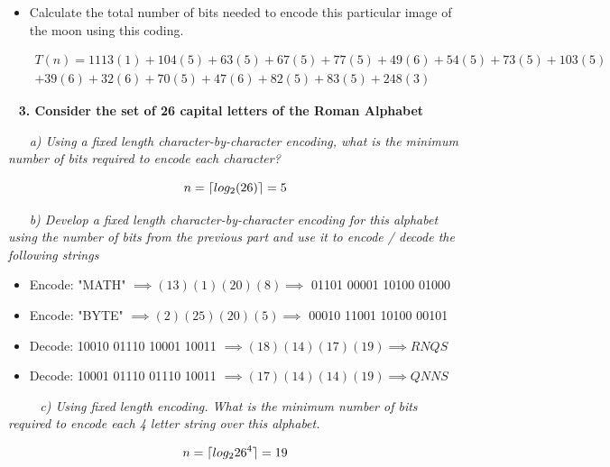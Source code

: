 \documentclass[12pt, letterpaper]{article}
\DeclarePairedDelimiter{\ceil}{\lceil}{\rceil}
\begin{document}
\begin{itemize}
\-\ \newline
\item Calculate the total number of bits needed to encode this particular image of the moon using this coding.

\begin{eqnarray*}
T(n) = 1113(1) + 104(5) + 63(5) + 67(5) + 77(5) + 49(6) + 54(5) + 73(5) + 103(5) \\
+ 39(6) + 32(6) + 70(5) + 47(6) + 82(5) + 83(5) + 248(3)
\end{eqnarray*}

\end{itemize}


\newpage
\-\ \newline
\bf{3. Consider the set of 26 capital letters of the Roman Alphabet}

\-\ \newline
\-\ \it{ a) Using a fixed length character-by-character encoding, what is the minimum number of bits required to encode each character? }

    \[ n = \ceil{ log_2(26) } = 5 \]

\-\ \newline
\-\ \it{ b) Develop a fixed length character-by-character encoding for this alphabet using the number of bits from the previous part and use it to encode / decode the following strings }
\begin{itemize}
\item Encode: "MATH" 
\(\implies (13)(1)(20)(8) \implies\) 01101 00001 10100 01000

\item Encode: "BYTE" 
\( \implies (2)(25)(20)(5) \implies \) 00010 11001 10100 00101

\item Decode: 10010 01110 10001 10011
\( \implies (18)(14)(17)(19) \implies RNQS\)

\item Decode: 10001 01110 01110 10011 
\( \implies (17)(14)(14)(19) \implies QNNS\)
\end{itemize}

\-\ \newline
\-\ \newline
\-\ \it{ c) Using fixed length encoding. What is the minimum number of bits required to encode each 4 letter string over this alphabet. }

\[ n = \ceil{ log_2{26^4} } = 19 \]
\end{document}
